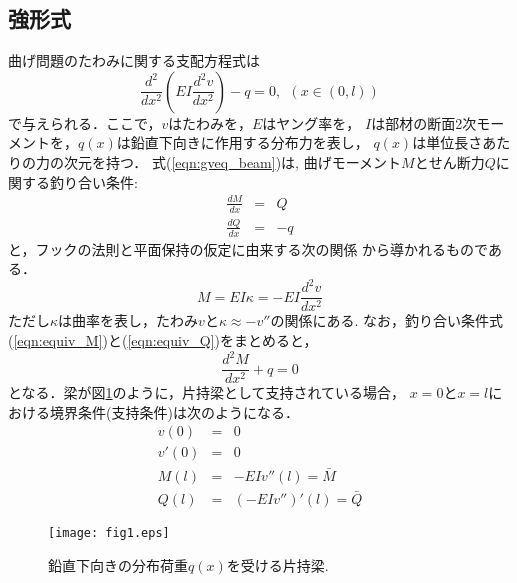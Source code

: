 \documentclass[10pt,a4j]{jarticle}
\begin{document}
\subsection{強形式}
曲げ問題のたわみに関する支配方程式は
\begin{equation}
	\frac{d^2}{dx^2}\left(EI \frac{d^2v}{dx^2}\right) -q =0, \ \ \left(x\in (0,l)\right)
	\label{eqn:gveq_beam}
\end{equation}
で与えられる．ここで，$v$はたわみを，$E$はヤング率を，
$I$は部材の断面2次モーメントを，$q(x)$は鉛直下向きに作用する分布力を表し，
$q(x)$は単位長さあたりの力の次元を持つ．
式(\ref{eqn:gveq_beam})は, 曲げモーメント$M$とせん断力$Q$に関する釣り合い条件:
\begin{eqnarray}
	\frac{dM}{dx} &=& Q
	\label{eqn:equiv_M} \\
	\frac{dQ}{dx} &=& -q
	\label{eqn:equiv_Q}
\end{eqnarray}
と，フックの法則と平面保持の仮定に由来する次の関係
から導かれるものである．
\begin{equation}
	M=EI \kappa= -EI\frac{d^2v}{dx^2}
	\label{eqn:M_k}
\end{equation}
ただし$\kappa$は曲率を表し，たわみ$v$と$\kappa\approx -v''$の関係にある. 
なお，釣り合い条件式(\ref{eqn:equiv_M})と(\ref{eqn:equiv_Q})をまとめると，
\begin{equation}
	\frac{d^2M}{dx^2}+q=0
	\label{eqn:equiv_MQ}
\end{equation}
となる．梁が図\ref{fig:fig2_1}のように，片持梁として支持されている場合，
$x=0$と$x=l$における境界条件(支持条件)は次のようになる．
\begin{eqnarray}
	v (0) &= & 0 
	\label{eqn:BC_v}
	\\
	v' (0) &= & 0 
	\label{eqn:BC_th}
	\\
	M (l) &= & -EI v''(l)=\bar M 
	\label{eqn:BC_M} \\
	Q (l) &= & \left(-EI v''\right)'(l)=\bar Q 
	\label{eqn:BC_Q} 
\end{eqnarray}
\begin{figure}[h]
	\begin{center}
	\texttt{[image: fig1.eps]} 
	\end{center}
	\caption{鉛直下向きの分布荷重$q(x)$を受ける片持梁.} 
	\label{fig:fig2_1}
\end{figure}
\end{document}
